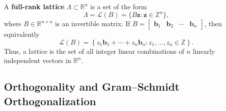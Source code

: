 \medskip

\begin{remark}
A \textbf{full-rank lattice} \(\Lambda \subset \mathbb{R}^n\) is a set of the form
\[
\Lambda=\mathcal{L}(B)=\{B\mathbf z:\mathbf z\in\mathbb Z^n\},
\]
where \(B\in\mathbb R^{n\times n}\) is an invertible matrix. If $
B=
\begin{bmatrix}
	\mathbf b_1 & \mathbf b_2 & \cdots & \mathbf b_n
\end{bmatrix}$, 
then equivalently
\[
\mathcal{L}(B)=
\left\{
z_1\mathbf b_1+\cdots+z_n\mathbf b_n
:
z_1,\dots,z_n\in\mathbb Z
\right\}.
\]
Thus, a lattice is the set of all integer linear combinations of \(n\) linearly independent vectors in \(\mathbb R^n\).	
\end{remark}
%



\newpage
\subsection{Orthogonality and Gram--Schmidt Orthogonalization}

